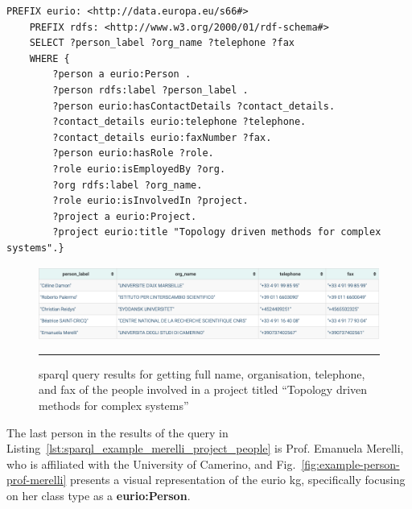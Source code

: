 \begin{lstlisting}[language=SPARQL, caption={\gls{sparql} query for getting full name, organisation, telephone, and fax of the people involved in a project titled ``Topology driven methods for complex systems''}, label=lst:sparql_example_merelli_project_people]
    PREFIX eurio: <http://data.europa.eu/s66#>
    PREFIX rdfs: <http://www.w3.org/2000/01/rdf-schema#>
    SELECT ?person_label ?org_name ?telephone ?fax
    WHERE {
        ?person a eurio:Person .
        ?person rdfs:label ?person_label .
        ?person eurio:hasContactDetails ?contact_details.
        ?contact_details eurio:telephone ?telephone.
        ?contact_details eurio:faxNumber ?fax.
        ?person eurio:hasRole ?role.
        ?role eurio:isEmployedBy ?org.
        ?org rdfs:label ?org_name.
        ?role eurio:isInvolvedIn ?project.
        ?project a eurio:Project.
        ?project eurio:title "Topology driven methods for complex systems".}
\end{lstlisting}

\begin{figure}[htbp]
    \centering
 \includegraphics[width=.9\textwidth]{figures/architecture/sparql_example_merelli_project_people.png}
     \rule{35em}{0.5pt}
    \caption{\gls{sparql} query results for getting full name, organisation, telephone, and fax of the people involved in a project titled ``Topology driven methods for complex systems''}
 \label{fig:sparql_example_merelli_project_people}
\end{figure}

The last person in the results of the query in Listing~\ref{lst:sparql_example_merelli_project_people} is Prof. Emanuela Merelli, who is affiliated with the University of Camerino, and Fig.~\ref{fig:example-person-prof-merelli} presents a visual representation of the \gls{eurio} \gls{kg}, specifically focusing on her class type as a \textbf{eurio:Person}.

